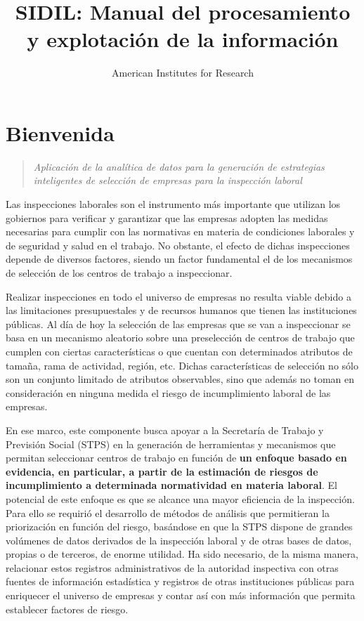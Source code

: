 \documentclass[
]{article}
\title{SIDIL: Manual del procesamiento y explotación de la información}
\author{American Institutes for Research}
\date{}
\begin{document}
\maketitle

{
\setcounter{tocdepth}{2}
\tableofcontents
}
\hypertarget{introapertura}{%
\section{Bienvenida}\label{introapertura}}

\begin{quote}
\emph{Aplicación de la analítica de datos para la generación de estrategias inteligentes de selección de empresas para la inspección laboral}
\end{quote}

Las inspecciones laborales son el instrumento más importante que utilizan los gobiernos para verificar y garantizar que las empresas adopten las medidas necesarias para cumplir con las normativas en materia de condiciones laborales y de seguridad y salud en el trabajo. No obstante, el efecto de dichas inspecciones depende de diversos factores, siendo un factor fundamental el de los mecanismos de selección de los centros de trabajo a inspeccionar.

Realizar inspecciones en todo el universo de empresas no resulta viable debido a las limitaciones presupuestales y de recursos humanos que tienen las instituciones públicas. Al día de hoy la selección de las empresas que se van a inspeccionar se basa en un mecanismo aleatorio sobre una preselección de centros de trabajo que cumplen con ciertas características o que cuentan con determinados atributos de tamaña, rama de actividad, región, etc. Dichas características de selección no sólo son un conjunto limitado de atributos observables, sino que además no toman en consideración en ninguna medida el riesgo de incumplimiento laboral de las empresas.

En ese marco, este componente busca apoyar a la Secretaría de Trabajo y Previsión Social (STPS) en la generación de herramientas y mecanismos que permitan seleccionar centros de trabajo en función de \textbf{un enfoque basado en evidencia, en particular, a partir de la estimación de riesgos de incumplimiento a determinada normatividad en materia laboral}. El potencial de este enfoque es que se alcance una mayor eficiencia de la inspección. Para ello se requirió el desarrollo de métodos de análisis que permitieran la priorización en función del riesgo, basándose en que la STPS dispone de grandes volúmenes de datos derivados de la inspección laboral y de otras bases de datos, propias o de terceros, de enorme utilidad. Ha sido necesario, de la misma manera, relacionar estos registros administrativos de la autoridad inspectiva con otras fuentes de información estadística y registros de otras instituciones públicas para enriquecer el universo de empresas y contar así con más información que permita establecer factores de riesgo.
\end{document}
